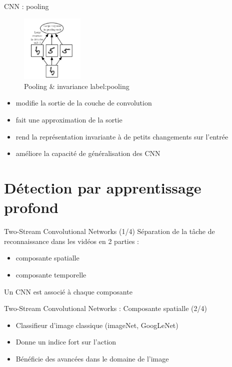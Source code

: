 \documentclass[presentation]{beamer}
\begin{document}
\begin{frame}[label={sec:orgdee1f1a}]{CNN : pooling}
\begin{figure}[htbp]
\centering
\includegraphics[width=3cm]{pooling.png}
\caption{Pooling \& invariance label:pooling}
\end{figure}

\begin{itemize}
\item modifie la sortie de la couche de convolution
\item fait une approximation de la sortie
\item rend la représentation \alert{invariante} à de petits changements sur l'entrée
\item améliore la capacité de généralisation des CNN
\end{itemize}
\end{frame}

\section{Détection par apprentissage profond}
\label{sec:orge9d0880}
\begin{frame}[label={sec:org2ab2a78}]{Two-Stream Convolutional Networks (1/4)}
Séparation de la tâche de reconnaissance dans les vidéos en 2 parties :
\begin{itemize}
\item composante spatialle
\item composante temporelle
\end{itemize}
Un CNN est associé à chaque composante
\end{frame}

\begin{frame}[label={sec:org0d01a78}]{Two-Stream Convolutional Networks : Composante spatialle (2/4)}
\begin{itemize}
\item Classifieur d'image classique (imageNet, GoogLeNet)
\item Donne un indice fort sur l'action
\item Bénéficie des avancées dans le domaine de l'image
\end{itemize}
\end{frame}
\end{document}
